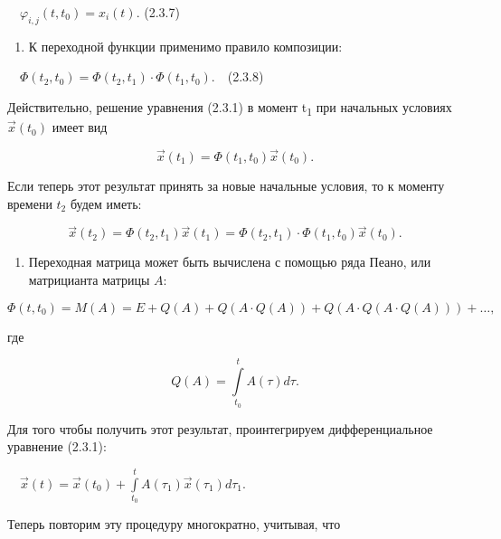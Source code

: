 		\ \  $\varphi _{i,j}(t,t_0)=x_i(t).$  (2.3.7)


\liststyleWWviiiNumlxviii
\begin{enumerate}
	\item 
			К переходной функции применимо правило композиции:
	
\end{enumerate}

		\ \  $\Phi (t_2,t_0)=\Phi (t_2,t_1)\cdot \Phi (t_1,t_0).$\ \ (2.3.8)



		Действительно, решение уравнения (2.3.1) в момент {t}\textsubscript{1} при начальных условиях  $\vec x(t_0)$
		имеет вид


\begin{equation*}
\vec x(t_1)=\Phi (t_1,t_0)\vec x(t_0).
\end{equation*}

		Если теперь этот результат принять за новые начальные условия, то к моменту времени  $t_2$ будем иметь:


\begin{equation*}
\vec x(t_2)=\Phi (t_2,t_1)\vec x(t_1)=\Phi (t_2,t_1)\cdot \Phi (t_1,t_0)\vec x(t_0).
\end{equation*}
\liststyleWWviiiNumlxviii
\setcounter{saveenum}{\value{enumi}}
\begin{enumerate}
	\setcounter{enumi}{\value{saveenum}}
	\item 
			Переходная матрица может быть вычислена с помощью ряда Пеано, или матрицианта матрицы  $A$:
	
\end{enumerate}
\begin{equation*}
\Phi (t,t_0)=M(A)=E+Q(A)+Q(A\cdot Q(A))+Q(A\cdot Q(A\cdot Q(A)))+\ldots ,
\end{equation*}

		где


\begin{equation*}
Q(A)=\overset t{\underset{t_0}{\int }}A(τ)\mathit{dτ}.
\end{equation*}

		Для того чтобы получить этот результат, проинтегрируем дифференциальное уравнение (2.3.1):



		\ \  $\vec x(t)=\vec x(t_0)+\overset t{\underset{t_0}{\int }}A(τ_1)\vec x(τ_1)\mathit{dτ}_1$.



		Теперь повторим эту процедуру многократно, учитывая, что


